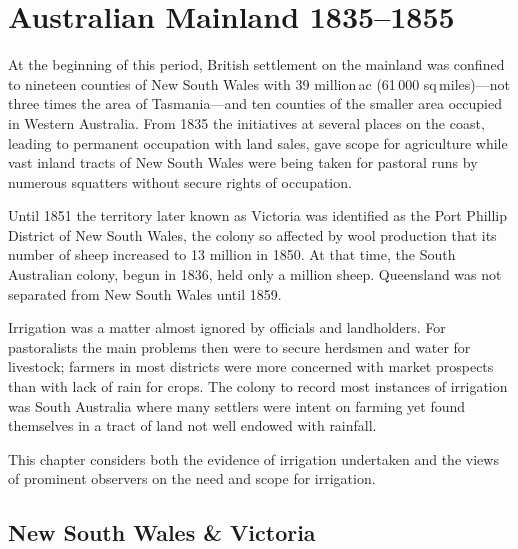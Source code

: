 
\setcounter{endnote}{0}

\chapter{Australian Mainland 1835--1855}
\label{ch:mainland} 

At the beginning of this period, British settlement on the mainland
was confined to nineteen counties of New South Wales with 39
million\,ac (61\,000 sq\,miles)---not three times the area of
Tasmania---and ten counties of the smaller area occupied in Western
Australia.  From 1835 the initiatives at several places on the coast,
leading to permanent occupation with land sales, gave scope for
agriculture while vast inland tracts of New South Wales were being
taken for pastoral runs by numerous squatters without secure rights of
occupation.

Until 1851 the territory later known as Victoria was identified as the
Port Phillip District of New South Wales, the colony so affected by
wool production that its number of sheep increased to 13 million in
1850.  At that time, the South Australian colony, begun in 1836, held
only a million sheep.  Queensland was not separated from New South
Wales until 1859.

Irrigation was a matter almost ignored by officials and landholders.
For pastoralists the main problems then were to secure herdsmen and
water for livestock; farmers in most districts were more concerned
with market prospects than with lack of rain for crops.  The colony to
record most instances of irrigation was South Australia where many
settlers were intent on farming yet found themselves in a tract of
land not well endowed with rainfall.

This chapter considers both the evidence of irrigation undertaken and
the views of prominent observers on the need and scope for irrigation.

\section*{New South Wales \& Victoria}

